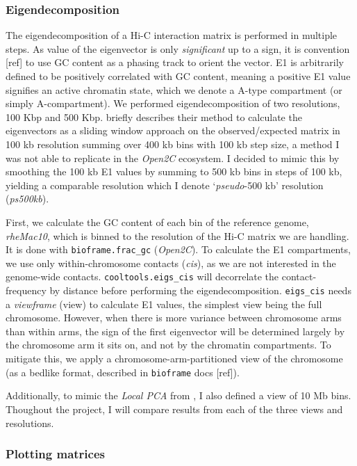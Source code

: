 \documentclass[
  11pt,
  a4paper,
]{scrbook}
\let\oldemph\emph
\renewcommand\emph[1]{\oldemph{\color{gray}#1}}
\begin{document}
\subsubsection{Eigendecomposition}\label{eigendecomposition}

The eigendecomposition of a Hi-C interaction matrix is performed in
multiple steps. As value of the eigenvector is only \emph{significant}
up to a sign, it is convention {[}ref{]} to use GC content as a phasing
track to orient the vector. E1 is arbitrarily defined to be positively
correlated with GC content, meaning a positive E1 value signifies an
active chromatin state, which we denote a A-type compartment (or simply
A-compartment). We performed eigendecomposition of two resolutions, 100
Kbp and 500 Kbp. \citet{wang_reprogramming_2019} briefly describes their
method to calculate the eigenvectors as a sliding window approach on the
observed/expected matrix in 100 kb resolution summing over 400 kb bins
with 100 kb step size, a method I was not able to replicate in the
\emph{Open2C} ecosystem. I decided to mimic this by smoothing the 100 kb
E1 values by summing to 500 kb bins in steps of 100 kb, yielding a
comparable resolution which I denote `\emph{pseudo}-500 kb' resolution
(\emph{ps500kb}).

First, we calculate the GC content of each bin of the reference genome,
\emph{rheMac10}, which is binned to the resolution of the Hi-C matrix we
are handling. It is done with \texttt{bioframe.frac\_gc}
(\emph{Open2C}). To calculate the E1 compartments, we use only
within-chromosome contacts (\emph{cis}), as we are not interested in the
genome-wide contacts. \texttt{cooltools.eigs\_cis} will decorrelate the
contact-frequency by distance before performing the eigendecomposition.
\texttt{eigs\_cis} needs a \emph{viewframe} (view) to calculate E1
values, the simplest view being the full chromosome. However, when there
is more variance between chromosome arms than within arms, the sign of
the first eigenvector will be determined largely by the chromosome arm
it sits on, and not by the chromatin compartments. To mitigate this, we
apply a chromosome-arm-partitioned view of the chromosome (as a bedlike
format, described in \texttt{bioframe} docs {[}ref{]}).

Additionally, to mimic the \emph{Local PCA} from
\citep{wang_reprogramming_2019}, I also defined a view of 10 Mb bins.
Thoughout the project, I will compare results from each of the three
views and resolutions.

\subsubsection{Plotting matrices}\label{plotting-matrices}
\end{document}
